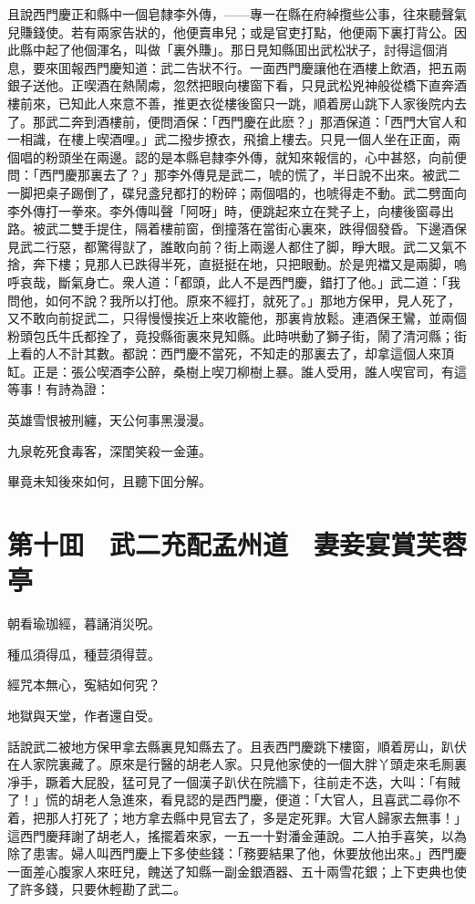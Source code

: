 且說西門慶正和縣中一個皂隸李外傳，——專一在縣在府綽攬些公事，往來聽聲氣兒賺錢使。若有兩家告狀的，他便賣串兒；或是官吏打點，他便兩下裏打背公。因此縣中起了他個渾名，叫做「裏外賺」。那日見知縣囬出武松狀子，討得這個消息，要來囬報西門慶知道：武二告狀不行。一面西門慶讓他在酒樓上飲酒，把五兩銀子送他。正喫酒在熱鬧䖏，忽然把眼向樓窗下看，只見武松兇神般從橋下直奔酒樓前來，已知此人來意不善，推更衣從樓後窗只一跳，順着房山跳下人家後院内去了。那武二奔到酒樓前，便問酒保：「西門慶在此麽？」那酒保道：「西門大官人和一相識，在樓上喫酒哩。」武二撥步撩衣，飛搶上樓去。只見一個人坐在正面，兩個唱的粉頭坐在兩邊。認的是本縣皂隸李外傳，就知來報信的，心中甚怒，向前便問：「西門慶那裏去了？」那李外傳見是武二，唬的慌了，半日說不出來。被武二一脚把桌子踢倒了，碟兒盞兒都打的粉碎；兩個唱的，也唬得走不動。武二劈面向李外傳打一拳來。李外傳叫聲「阿呀」時，便跳起來立在凳子上，向樓後窗尋出路。被武二雙手提住，隔着樓前窗，倒撞落在當街心裏來，跌得個發昏。下邊酒保見武二行惡，都驚得獃了，誰敢向前？街上兩邊人都住了脚，睜大眼。武二又氣不捨，奔下樓；見那人已跌得半死，直挺挺在地，只把眼動。於是兜襠又是兩脚，嗚呼哀哉，斷氣身亡。衆人道：「都頭，此人不是西門慶，錯打了他。」武二道：「我問他，如何不說？我所以打他。原來不經打，就死了。」那地方保甲，見人死了，又不敢向前捉武二，只得慢慢挨近上來收籠他，那裏肯放鬆。連酒保王鸞，並兩個粉頭包氏牛氏都拴了，竟投縣衙裏來見知縣。此時哄動了獅子街，鬧了清河縣；街上看的人不計其數。都說：西門慶不當死，不知走的那裏去了，却拿這個人來頂缸。正是：張公喫酒李公醉，桑樹上喫刀柳樹上暴。誰人受用，誰人喫官司，有這等事！有詩為證：

英雄雪恨被刑纏，天公何事黑漫漫。

九泉乾死食毒客，深閨笑殺一金蓮。

畢竟未知後來如何，且聽下囬分解。

\chapter*{第十囬　武二充配孟州道　妻妾宴賞芙蓉亭}

朝看瑜珈經，暮誦消災呪。

種瓜須得瓜，種荳須得荳。

經咒本無心，寃結如何究？

地獄與天堂，作者還自受。

話說武二被地方保甲拿去縣裏見知縣去了。且表西門慶跳下樓窗，順着房山，趴伏在人家院裏藏了。原來是行醫的胡老人家。只見他家使的一個大胖丫頭走來毛厠裏凈手，蹶着大屁股，猛可見了一個漢子趴伏在院牆下，往前走不迭，大叫：「有賊了！」慌的胡老人急進來，看見認的是西門慶，便道：「大官人，且喜武二尋你不着，把那人打死了；地方拿去縣中見官去了，多是定死罪。大官人歸家去無事！」這西門慶拜謝了胡老人，搖擺着來家，一五一十對潘金蓮說。二人拍手喜笑，以為除了患害。婦人叫西門慶上下多使些錢：「務要結果了他，休要放他出來。」西門慶一面差心腹家人來旺兒，餽送了知縣一副金銀酒器、五十兩雪花銀；上下吏典也使了許多錢，只要休輕勘了武二。

